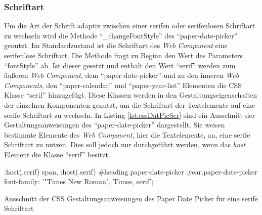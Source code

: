 \documentclass[12pt, paper=a4, bibtotoc, toc=listof, headsepline=true]{scrreprt}
\begin{document}
		\subsubsection{Schriftart}
		Um die Art der Schrift adaptiv zwischen einer serifen oder serifenlosen Schriftart zu wechseln wird die Methode \enquote{\_changeFontStyle} des \enquote{paper-date-picker} genutzt. Im Standardzustand ist die Schriftart des \emph{Web Component} eine serifenlose Schriftart. Die Methode fragt zu Beginn den Wert des Parameters \enquote{fontStyle} ab. Ist dieser gesetzt und enthält den Wert \enquote{serif} werden zum äußeren \emph{Web Component}, dem \enquote{paper-date-picker} und zu den inneren \emph{Web Components}, den \enquote{paper-calendar} und \enquote{paper-year-list} Elementen die \ac{CSS} Klasse \enquote{serif} hinzugefügt. Diese Klassen werden in den Gestaltungseigenschaften der einzelnen Komponenten genutzt, um die Schriftart der Textelemente auf eine serife Schriftart zu wechseln. In Listing \ref{lst:cssDatPicSer} sind ein Ausschnitt der Gestaltungsanweisungen des \enquote{paper-date-picker} dargestellt. Sie weisen bestimmte Elemente des \emph{Web Component}, hier die Textelemente, an, eine serife Schriftart zu nutzen. Dies soll jedoch nur durchgeführt werden, wenn das \emph{host} Element die Klasse \enquote{serif} besitzt.
		\begin{listing}
			\begin{CSScode*}{}
:host(.serif) span, :host(.serif) #heading.paper-date-picker .year.paper-date-picker{
   font-family: '"Times New Roman", Times, serif';
}
			\end{CSScode*}
			\caption[CSS des Paper Date Picker für serife Schriftart]{Ausschnitt der CSS Gestaltungsanweisungen des Paper Date Picker für eine serife Schriftart}
			\label{lst:cssDatPicSer}
		\end{listing}
\end{document}
